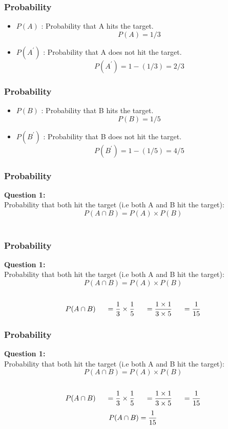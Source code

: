\documentclass{beamer}
\begin{document}
\begin{frame}
\Large{
\frametitle{Probability}
\begin{itemize}
\item $P(A)$ : Probability that A hits the target. 
\[ P(A) = 1/3 \]

\item $P(A^\prime)$ : Probability that A does not hit the target. 
\[ P(A^\prime) =  1-(1/3) = 2/3 \]

\end{itemize}
}
\end{frame}

\begin{frame}
\Large{
\frametitle{Probability}
\begin{itemize}

\item $P(B)$ : Probability that B hits the target. \[ P(B) = 1/5 \]
\item $P(B^\prime)$ : Probability that B does not hit the target.
\[ P(B^\prime) =  1-(1/5) = 4/5 \]
\end{itemize}
}
\end{frame}
\begin{frame}
\Large{
\frametitle{Probability}
\textbf{Question 1:}\\
Probability that both hit the target (i.e both A and B hit the target): 
\[P(A \cap B) = P(A) \times P(B)  \]\\


}
\end{frame}
\begin{frame}
\Large{
\frametitle{Probability}
\textbf{Question 1:}\\
Probability that both hit the target (i.e both A and B hit the target): 
\[P(A \cap B) = P(A) \times P(B)  \]\\
\[P(A \cap B) \hspace{0.5cm}= {1 \over 3} \times {1 \over 5} \hspace{0.5cm}  = {1 \times 1 \over 3 \times 5} \hspace{0.5cm} = {1 \over 15}  \]

}
\end{frame}
\begin{frame}
\Large{
\frametitle{Probability}
\textbf{Question 1:}\\
Probability that both hit the target (i.e both A and B hit the target): 
\[P(A \cap B) = P(A) \times P(B)  \]\\
\[P(A \cap B) \hspace{0.5cm}= {1 \over 3} \times {1 \over 5} \hspace{0.5cm}  = {1 \times 1 \over 3 \times 5} \hspace{0.5cm} = {1 \over 15}  \]
\[P(A \cap B) = {1 \over 15} \]\\
}
\end{frame}
\end{document}
